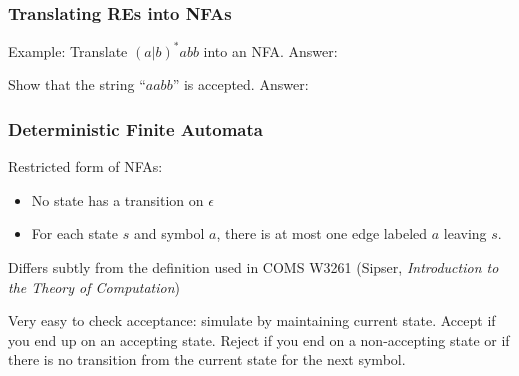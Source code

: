 \documentclass{plt}
\begin{document}
\begin{frame}[fragile]
  \frametitle{Translating REs into NFAs}

Example: Translate $(a|b)^*abb$ into an NFA. Answer:


Show that the string ``$aabb$'' is accepted. Answer:



\end{frame}


\begin{frame}
  \frametitle{Deterministic Finite Automata}

Restricted form of NFAs:

\begin{itemize}
\item No state has a transition on $\epsilon$
\item For each state $s$ and symbol $a$, there is at most one edge
  labeled $a$ leaving $s$.
\end{itemize}

Differs subtly from the definition used in COMS W3261 (Sipser,
\emph{Introduction to the Theory of Computation})

Very easy to check acceptance: simulate by maintaining current state.
Accept if you end up on an accepting state. Reject if you end on a
non-accepting state or if there is no transition from the current
state for the next symbol.

\end{frame}
\end{document}

